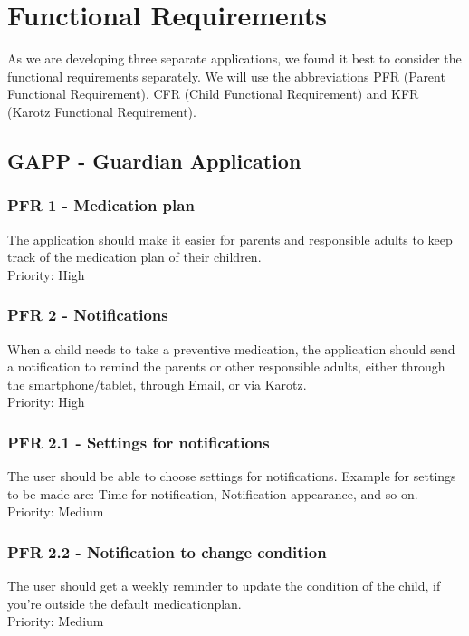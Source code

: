 \section{Functional Requirements}
\label{sec:functionalRequirements}
As we are developing three separate applications, we found it best to consider
the functional requirements separately. 
We will use the abbreviations PFR (Parent Functional Requirement), 
CFR (Child Functional Requirement) and KFR (Karotz Functional Requirement).

\subsection{GAPP - Guardian Application}

\subsubsection{PFR 1 - Medication plan}
The application should make it easier for parents and responsible adults to keep
track of the medication plan of their children.
\\
Priority: High

\subsubsection{PFR 2 - Notifications}
When a child needs to take a preventive medication, the application should
send a notification to remind the parents or other responsible adults,
either through the smartphone/tablet, through Email, or via Karotz.
\\
Priority: High

\subsubsection{PFR 2.1 - Settings for notifications}
The user should be able to choose settings for notifications. Example for
settings to be made are: Time for notification, Notification appearance, and so
on.
\\
Priority: Medium

\subsubsection{PFR 2.2 - Notification to change condition}
The user should get a weekly reminder to update the condition of the child, 
if you're outside the default medicationplan.
\\
Priority: Medium


